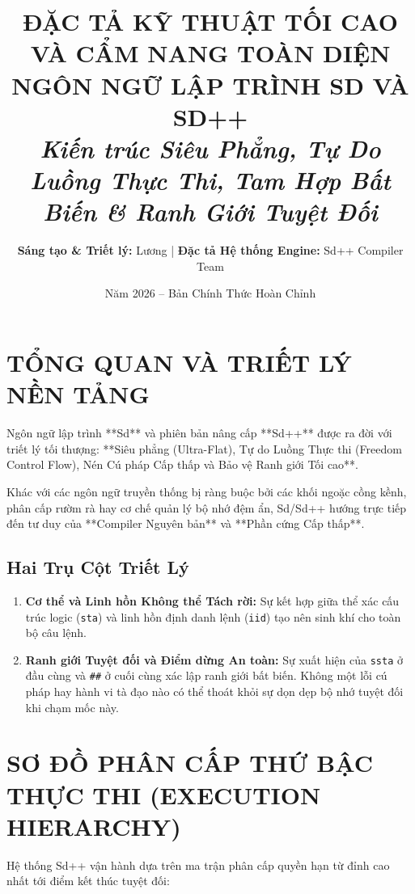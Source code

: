 \documentclass[11pt, a4paper]{article}
\title{\textbf{ĐẶC TẢ KỸ THUẬT TỐI CAO VÀ CẨM NANG TOÀN DIỆN\\NGÔN NGỮ LẬP TRÌNH SD VÀ SD++}\\
\large\textit{Kiến trúc Siêu Phẳng, Tự Do Luồng Thực Thi, Tam Hợp Bất Biến \& Ranh Giới Tuyệt Đối}}
\author{\textbf{Sáng tạo \& Triết lý:} Lương | \textbf{Đặc tả Hệ thống Engine:} Sd++ Compiler Team}
\date{Năm 2026 -- Bản Chính Thức Hoàn Chỉnh}
\begin{document}
\maketitle

\tableofcontents
\newpage

\section{TỔNG QUAN VÀ TRIẾT LÝ NỀN TẢNG}

Ngôn ngữ lập trình **Sd** và phiên bản nâng cấp **Sd++** được ra đời với triết lý tối thượng: **Siêu phẳng (Ultra-Flat), Tự do Luồng Thực thi (Freedom Control Flow), Nén Cú pháp Cấp thấp và Bảo vệ Ranh giới Tối cao**. 

Khác với các ngôn ngữ truyền thống bị ràng buộc bởi các khối ngoặc cồng kềnh, phân cấp rườm rà hay cơ chế quản lý bộ nhớ đệm ẩn, Sd/Sd++ hướng trực tiếp đến tư duy của **Compiler Nguyên bản** và **Phần cứng Cấp thấp**.

\subsection{Hai Trụ Cột Triết Lý}
\begin{enumerate}
    \item \textbf{Cơ thể và Linh hồn Không thể Tách rời:} Sự kết hợp giữa thể xác cấu trúc logic (\texttt{sta}) và linh hồn định danh lệnh (\texttt{iid}) tạo nên sinh khí cho toàn bộ câu lệnh.
    \item \textbf{Ranh giới Tuyệt đối và Điểm dừng An toàn:} Sự xuất hiện của \texttt{ssta} ở đầu cùng và \texttt{\#\#} ở cuối cùng xác lập ranh giới bất biến. Không một lỗi cú pháp hay hành vi tà đạo nào có thể thoát khỏi sự dọn dẹp bộ nhớ tuyệt đối khi chạm mốc này.
\end{enumerate}

\section{SƠ ĐỒ PHÂN CẤP THỨ BẬC THỰC THI (EXECUTION HIERARCHY)}

Hệ thống Sd++ vận hành dựa trên ma trận phân cấp quyền hạn từ đỉnh cao nhất tới điểm kết thúc tuyệt đối:
\end{document}
